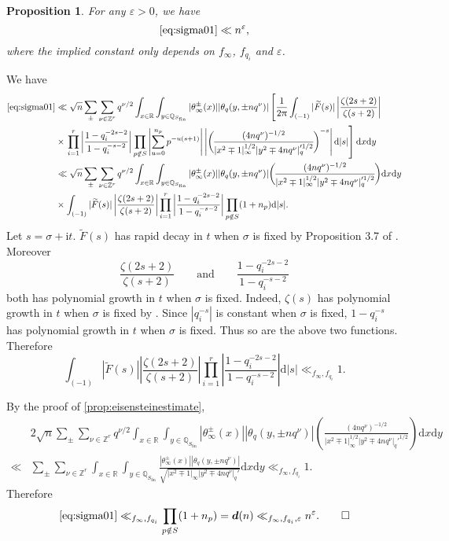 \documentclass[10pt,oneside,reqno]{amsart}
\makeatletter
\let\SSec\S
\newcommand\rmd{\mathrm{d}}
\newcommand\rmi{\mathrm{i}}
\newcommand\QQ{\mathbb{Q}}
\newcommand\RR{\mathbb{R}}
\newcommand\ZZ{\mathbb{Z}}
\renewcommand\S{\mathsf{S}}
\newcommand\fin{\mathrm{fin}}
\newcommand\legendresymbol[2]{\genfrac{(}{)}{}{}{#1}{#2}}
\theoremstyle{THEOREM}
\newtheorem{proposition}[theorem]{Proposition}
\theoremstyle{DEFINITION}
\theoremstyle{EXERCISE}
\numberwithin{equation}{section}
\renewenvironment{proof}[1][\proofname]{\par
  \vspace{-6pt}
  \pushQED{\qed}
  \normalfont \topsep6\p@\@plus6\p@\relax
  \trivlist
  \item[\hskip\labelsep\rmfamily\bfseries
    #1\@addpunct{:}]\ignorespaces
}{
  \popQED\endtrivlist\@endpefalse
  \vspace{-6pt}
}
\makeatother
\begin{document}
\begin{proposition}\label{prop:sigma01estimate}
For any $\varepsilon>0$, we have
\[
\eqref{eq:sigma01}\ll n^\varepsilon,
\] 
where the implied constant only depends on $f_\infty$, $f_{q_i}$ and $\varepsilon$.
\end{proposition}
\begin{proof}
We have
\begin{align*}
  \eqref{eq:sigma01} & \ll \sqrt{n}\sum_{\pm}\sum_{\nu\in \ZZ^r}q^{\nu/2}\int_{x\in \RR}\int_{y\in \QQ_{S_\fin}}|\theta_\infty^\pm(x)||\theta_{q}(y,\pm nq^\nu)|
  \left[\frac{1}{2\uppi}\int_{(-1)}|\widetilde{F}(s)|\left|\frac{\zeta(2s+2)}{\zeta(s+2)} \right| \right.\\
  &\times\left.\prod_{i=1}^{r}\left|\frac{1-q_i^{-2s-2}}{1-q_i^{-s-2}}\right|\prod_{p\notin S}\left|\sum_{u=0}^{n_p}p^{-u(s+1)}\right|\left|\legendresymbol{(4nq^\nu)^{-1/2}}{|x^2\mp 1|_\infty^{1/2}|y^2\mp 4nq^\nu|_q'^{1/2}}^{-s}\right|\rmd |s|\right]\rmd x\rmd y\\
  & \ll \sqrt{n}\sum_{\pm}\sum_{\nu\in \ZZ^r}q^{\nu/2}\int_{x\in \RR}\int_{y\in \QQ_{S_\fin}}|\theta_\infty^\pm(x)||\theta_{q}(y,\pm nq^\nu)|\legendresymbol{(4nq^\nu)^{-1/2}}{|x^2\mp 1|_\infty^{1/2}|y^2\mp 4nq^\nu|_q'^{1/2}}\rmd x\rmd y\\
  &\times
  \int_{(-1)}|\widetilde{F}(s)|\left|\frac{\zeta(2s+2)}{\zeta(s+2)} \right| \prod_{i=1}^{r}\left|\frac{1-q_i^{-2s-2}}{1-q_i^{-s-2}}\right|\prod_{p\notin S}(1+n_p)\rmd |s|.
\end{align*}
Let $s=\sigma+\rmi t$. $\widetilde{F}(s)$ has rapid decay in $t$ when $\sigma$ is fixed by Proposition 3.7 of \cite{cheng2025}. Moreover
\[
\frac{\zeta(2s+2)}{\zeta(s+2)}\qquad\text{and}\qquad \frac{1-q_i^{-2s-2}}{1-q_i^{-s-2}}
\]
both has polynomial growth in $t$ when $\sigma$ is fixed. Indeed, $\zeta(s)$ has polynomial growth in $t$ when $\sigma$ is fixed by \cite[Part II, \SSec 1.6]{tenenbaum2015analytic}. Since $|q_i^{-s}|$ is constant when $\sigma$ is fixed, $1-q_i^{-s}$ has polynomial growth in $t$ when $\sigma$ is fixed. Thus so are the above two functions. Therefore
\[
\int_{(-1)}|\widetilde{F}(s)|\left|\frac{\zeta(2s+2)}{\zeta(s+2)} \right| \prod_{i=1}^{r}\left|\frac{1-q_i^{-2s-2}}{1-q_i^{-s-2}}\right|\rmd |s|\ll_{f_\infty,f_{q_i}} 1.
\]

By the proof of \autoref{prop:eisensteinestimate},
\begin{align*}
&2\sqrt{n}\sum_{\pm}\sum_{\nu\in \ZZ^r}q^{\nu/2}\int_{x\in \RR}\int_{y\in \QQ_{S_\fin}}|\theta_\infty^\pm(x)||\theta_{q}(y,\pm nq^\nu)|\legendresymbol{(4nq^\nu)^{-1/2}}{|x^2\mp 1|_\infty^{1/2}|y^2\mp 4nq^\nu|_q'^{1/2}}\rmd x\rmd y\\
  \ll&\sum_{\pm}\sum_{\nu\in \ZZ^r}\int_{x\in \RR}\int_{y\in \QQ_{S_\fin}}\frac{|\theta_\infty^\pm(x)||\theta_{q}(y,\pm nq^\nu)|}{\sqrt{|x^2\mp 1|_\infty|y^2\mp 4nq^\nu|_q'}}\rmd x\rmd y\ll_{f_\infty,f_{q_i}} 1.
\end{align*}
Therefore
\[
\eqref{eq:sigma01}\ll_{f_\infty,f_{q_i}} \prod_{p\notin S}(1+n_p)=\bm{d}(n)\ll_{f_\infty,f_{q_i},\varepsilon} n^\varepsilon.\qedhere
\]
\end{proof}
\end{document}

